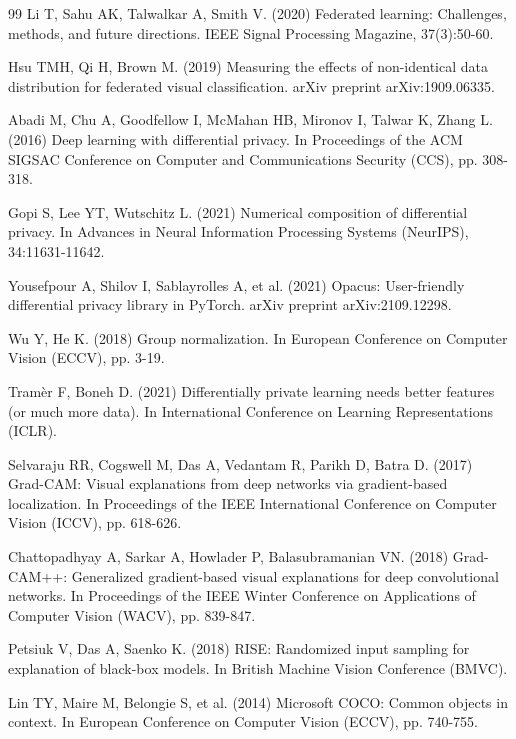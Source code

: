 \documentclass[twocolumn,a4paper,10pt]{article}
\begin{document}
\begin{thebibliography}{99}
 Li T, Sahu AK, Talwalkar A, Smith V. (2020) Federated learning:
Challenges, methods, and future directions. IEEE Signal Processing Magazine,
37(3):50-60.

 Hsu TMH, Qi H, Brown M. (2019) Measuring the effects of
non-identical data distribution for federated visual classification. arXiv
preprint arXiv:1909.06335.

 Abadi M, Chu A, Goodfellow I, McMahan HB, Mironov I, Talwar
K, Zhang L. (2016) Deep learning with differential privacy. In Proceedings of
the ACM SIGSAC Conference on Computer and Communications Security (CCS), pp.
308-318.

 Gopi S, Lee YT, Wutschitz L. (2021) Numerical composition of
differential privacy. In Advances in Neural Information Processing Systems
(NeurIPS), 34:11631-11642.

 Yousefpour A, Shilov I, Sablayrolles A, et al. (2021)
Opacus: User-friendly differential privacy library in PyTorch. arXiv preprint
arXiv:2109.12298.

 Wu Y, He K. (2018) Group normalization. In European
Conference on Computer Vision (ECCV), pp. 3-19.

 Tram\`er F, Boneh D. (2021) Differentially private learning
needs better features (or much more data). In International Conference on
Learning Representations (ICLR).

 Selvaraju RR, Cogswell M, Das A, Vedantam R, Parikh D, Batra
D. (2017) Grad-CAM: Visual explanations from deep networks via gradient-based
localization. In Proceedings of the IEEE International Conference on Computer
Vision (ICCV), pp. 618-626.

 Chattopadhyay A, Sarkar A, Howlader P, Balasubramanian VN.
(2018) Grad-CAM++: Generalized gradient-based visual explanations for deep
convolutional networks. In Proceedings of the IEEE Winter Conference on
Applications of Computer Vision (WACV), pp. 839-847.

 Petsiuk V, Das A, Saenko K. (2018) RISE: Randomized input
sampling for explanation of black-box models. In British Machine Vision
Conference (BMVC).

 Lin TY, Maire M, Belongie S, et al. (2014) Microsoft COCO:
Common objects in context. In European Conference on Computer Vision (ECCV),
pp. 740-755.

\end{thebibliography}
\end{document}
